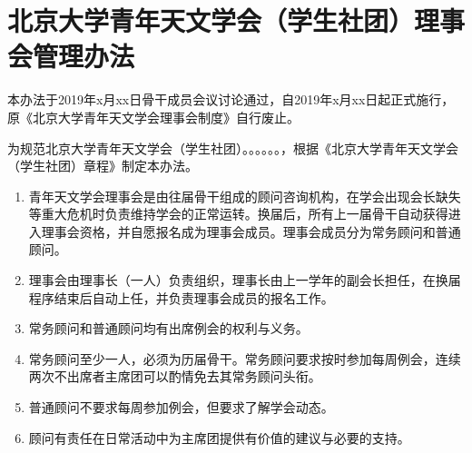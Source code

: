 \chapter{北京大学青年天文学会（学生社团）理事会管理办法}

本办法于2019年x月xx日骨干成员会议讨论通过，自2019年x月xx日起正式施行，原《北京大学青年天文学会理事会制度》自行废止。

为规范北京大学青年天文学会（学生社团）。。。。。。，根据《北京大学青年天文学会（学生社团）章程》制定本办法。

\begin{enumerate}
    \item 青年天文学会理事会是由往届骨干组成的顾问咨询机构，在学会出现会长缺失等重大危机时负责维持学会的正常运转。换届后，所有上一届骨干自动获得进入理事会资格，并自愿报名成为理事会成员。理事会成员分为常务顾问和普通顾问。
    
    \item 理事会由理事长（一人）负责组织，理事长由上一学年的副会长担任，在换届程序结束后自动上任，并负责理事会成员的报名工作。
    
    \item 常务顾问和普通顾问均有出席例会的权利与义务。
    
    \item 常务顾问至少一人，必须为历届骨干。常务顾问要求按时参加每周例会，连续两次不出席者主席团可以酌情免去其常务顾问头衔。
    
    \item 普通顾问不要求每周参加例会，但要求了解学会动态。
    
    \item 顾问有责任在日常活动中为主席团提供有价值的建议与必要的支持。
\end{enumerate}
